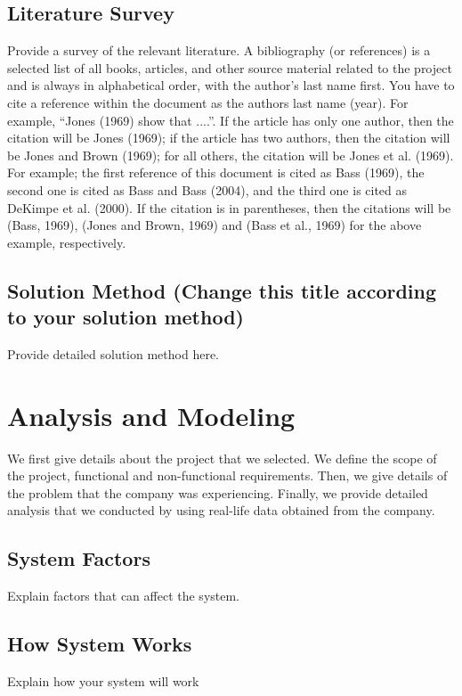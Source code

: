 \documentclass{mefsdp}
\begin{document}
	\subsection{Literature Survey}
	Provide a survey of the relevant literature. A bibliography (or references) is a selected list of all books, articles, and other source material related to the project and is always in alphabetical order, with the author's last name first. You have to cite a reference within the document as the authors last name (year). For example, “Jones (1969) show that ....”. If the article has only one author, then the citation will be Jones (1969); if the article has two authors, then the citation will be Jones and Brown (1969); for all others, the citation will be Jones et al. (1969). For example; the first reference of this document is cited as Bass (1969), the second one is cited as Bass and Bass (2004), and the third one is cited as DeKimpe et al. (2000). If the citation is in parentheses, then the citations will be (Bass, 1969), (Jones and Brown, 1969) and (Bass et al., 1969) for the above example, respectively. 
	\cite{DBLP:journals/corr/VaswaniSPUJGKP17}
	
	\subsection{Solution Method (Change this title according to your solution method)}
	Provide detailed solution method here.
	
	
	\section{Analysis and Modeling}
	We first give details about the project that we selected. We define the scope of the project, functional and non-functional requirements. Then, we give details of the problem that the company was experiencing. Finally, we provide detailed analysis that we conducted by using real-life data obtained from the company. 
	
	\subsection{System Factors}
	Explain factors that can affect the system.
	
	\subsection{How System Works}
	Explain how your system will work
	
\end{document}
